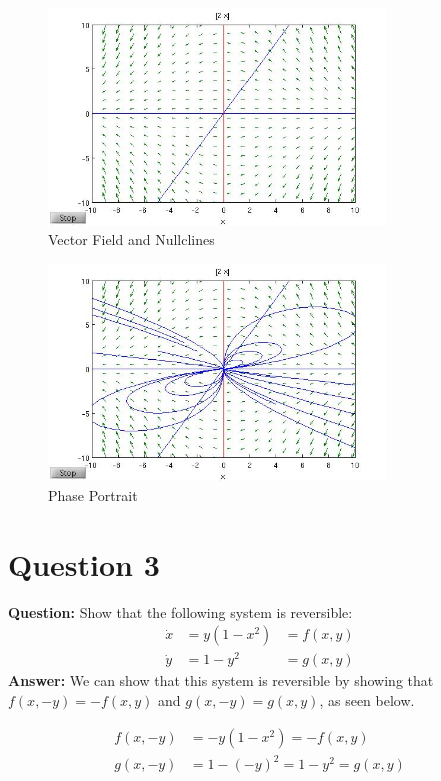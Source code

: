 \documentclass[12pt]{article}
\newenvironment{myenv}{\begin{adjustwidth}{1cm}{}}{\end{adjustwidth}}
\begin{document}
\begin{myenv}
\begin{figure} [H]
    \centering
    \includegraphics[width=0.8\textwidth]{Question2_VectorField}
    \caption{ Vector Field and Nullclines}
    \label{figure:a0}
\end{figure}


\begin{figure} [H]
    \centering
    \includegraphics[width=0.8\textwidth]{Question2_PhasePortrait}
    \caption{ Phase Portrait}
    \label{figure:a0}
\end{figure}
\end{myenv}

\section*{Question 3}
\textbf{Question:} Show that the following system is reversible:
\begin{alignat*}{3}
\dot{x} &= y(1-x^2) &= f(x,y)\\
\dot{y} &= 1-y^2 &= g(x,y)
\end{alignat*}
\textbf{Answer:} We can show that this system is reversible by showing that $f(x,-y) = -f(x,y)$ and $g(x,-y) = g(x,y)$, as seen below.

\begin{alignat*}{3}
f(x,-y) &= -y(1-x^2) = -f(x,y) \\
g(x,-y) &= 1 - (-y)^2 = 1-y^2 = g(x,y)
\end{alignat*}
\end{document}
